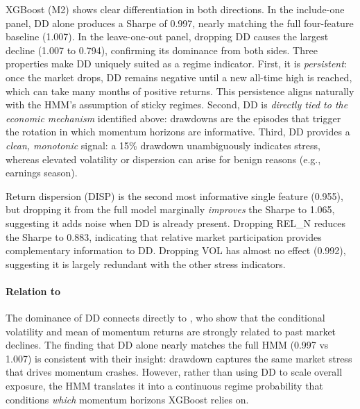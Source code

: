XGBoost (M2) shows clear differentiation in both directions. In the include-one panel, DD alone produces a Sharpe of 0.997, nearly matching the full four-feature baseline (1.007). In the leave-one-out panel, dropping DD causes the largest decline (1.007 to 0.794), confirming its dominance from both sides. Three properties make DD uniquely suited as a regime indicator. First, it is \emph{persistent}: once the market drops, DD remains negative until a new all-time high is reached, which can take many months of positive returns. This persistence aligns naturally with the HMM's assumption of sticky regimes. Second, DD is \emph{directly tied to the economic mechanism} identified above: drawdowns are the episodes that trigger the rotation in which momentum horizons are informative. Third, DD provides a \emph{clean, monotonic} signal: a 15\% drawdown unambiguously indicates stress, whereas elevated volatility or dispersion can arise for benign reasons (e.g., earnings season).

Return dispersion (DISP) is the second most informative single feature (0.955), but dropping it from the full model marginally \emph{improves} the Sharpe to 1.065, suggesting it adds noise when DD is already present. Dropping REL\_N reduces the Sharpe to 0.883, indicating that relative market participation provides complementary information to DD. Dropping VOL has almost no effect (0.992), suggesting it is largely redundant with the other stress indicators.

\paragraph{Relation to \citet{DanielMoskowitz2016}}
The dominance of DD connects directly to \citet{DanielMoskowitz2016}, who show that the conditional volatility and mean of momentum returns are strongly related to past market declines. The finding that DD alone nearly matches the full HMM (0.997 vs 1.007) is consistent with their insight: drawdown captures the same market stress that drives momentum crashes. However, rather than using DD to scale overall exposure, the HMM translates it into a continuous regime probability that conditions \emph{which} momentum horizons XGBoost relies on.


